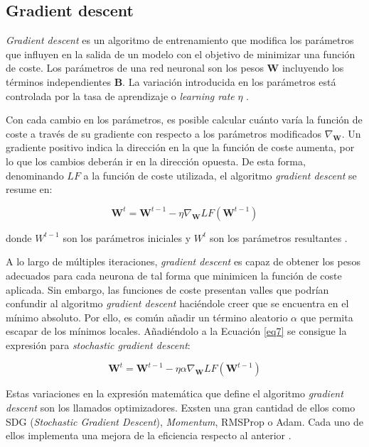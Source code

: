 \subsection{Gradient descent}

\textit{Gradient descent} es un algoritmo de entrenamiento que modifica los parámetros que influyen en la salida de un modelo con el objetivo de minimizar una función de coste. Los parámetros de una red neuronal son los pesos $\textbf{W}$ incluyendo los términos independientes $\textbf{B}$. La variación introducida en los parámetros está controlada por la tasa de aprendizaje o \textit{learning rate} $\eta$ \cite{bottou2018}.

Con cada cambio en los parámetros, es posible calcular cuánto varía la función de coste a través de su gradiente con respecto a los parámetros modificados $\nabla_\textbf{W}$. Un gradiente positivo indica la dirección en la que la función de coste aumenta, por lo que los cambios deberán ir en la dirección opuesta. De esta forma, denominando $LF$ a la función de coste utilizada, el algoritmo \textit{gradient descent} se resume en:

\begin{equation}
	\label{eq7} \textbf{W}^t=\textbf{W}^{t-1}-\eta \nabla_\textbf{W}LF(\textbf{W}^{t-1})
\end{equation}

donde $W^{t-1}$ son los parámetros iniciales y $W^t$ son los parámetros resultantes \cite{machinelearningbook}.

A lo largo de múltiples iteraciones, \textit{gradient descent} es capaz de obtener los pesos adecuados para cada neurona de tal forma que minimicen la función de coste aplicada. Sin embargo, las funciones de coste presentan valles que podrían confundir al algoritmo \textit{gradient descent} haciéndole creer que se encuentra en el mínimo absoluto. Por ello, es común añadir un término aleatorio $\alpha$ que permita escapar de los mínimos locales. Añadiéndolo a la Ecuación \ref{eq7} se consigue la expresión para \textit{stochastic gradient descent}:

\begin{equation}
	\label{eq8} \textbf{W}^t=\textbf{W}^{t-1}-\eta \alpha \nabla_\textbf{W}LF(\textbf{W}^{t-1})
\end{equation}

Estas variaciones en la expresión matemática que define el algoritmo \textit{gradient descent} son los llamados optimizadores. Exsten una gran cantidad de ellos como SDG (\textit{Stochastic Gradient Descent}), \textit{Momentum}, RMSProp o Adam. Cada uno de ellos implementa una mejora de la eficiencia respecto al anterior \cite{sgd}.


